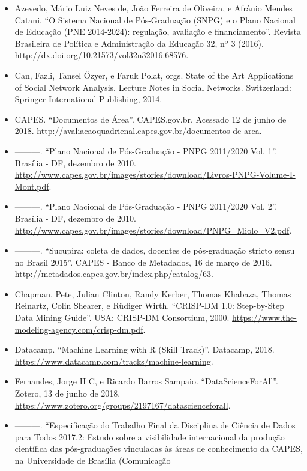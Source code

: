 \documentclass[]{article}
\providecommand{\tightlist}{%
  \setlength{\itemsep}{0pt}\setlength{\parskip}{0pt}}
\begin{document}
\begin{itemize}
\tightlist
\item
  Azevedo, Mário Luiz Neves de, João Ferreira de Oliveira, e Afrânio
  Mendes Catani. ``O Sistema Nacional de Pós-Graduação (SNPG) e o Plano
  Nacional de Educação (PNE 2014-2024): regulação, avaliação e
  financiamento''. Revista Brasileira de Política e Administração da
  Educação 32, nº 3 (2016).
  \url{http://dx.doi.org/10.21573/vol32n32016.68576}.
\item
  Can, Fazli, Tansel Özyer, e Faruk Polat, orgs. State of the Art
  Applications of Social Network Analysis. Lecture Notes in Social
  Networks. Switzerland: Springer International Publishing, 2014.
\item
  CAPES. ``Documentos de Área''. CAPES.gov.br. Acessado 12 de junho de
  2018.
  \url{http://avaliacaoquadrienal.capes.gov.br/documentos-de-area}.
\item
  ---------. ``Plano Nacional de Pós-Graduação - PNPG 2011/2020 Vol.
  1''. Brasília - DF, dezembro de 2010.
  \url{http://www.capes.gov.br/images/stories/download/Livros-PNPG-Volume-I-Mont.pdf}.
\item
  ---------. ``Plano Nacional de Pós-Graduação - PNPG 2011/2020 Vol.
  2''. Brasília - DF, dezembro de 2010.
  \url{http://www.capes.gov.br/images/stories/download/PNPG_Miolo_V2.pdf}.
\item
  ---------. ``Sucupira: coleta de dados, docentes de pós-graduação
  stricto sensu no Brasil 2015''. CAPES - Banco de Metadados, 16 de
  março de 2016.
  \url{http://metadados.capes.gov.br/index.php/catalog/63}.
\item
  Chapman, Pete, Julian Clinton, Randy Kerber, Thomas Khabaza, Thomas
  Reinartz, Colin Shearer, e Rüdiger Wirth. ``CRISP-DM 1.0: Step-by-Step
  Data Mining Guide''. USA: CRISP-DM Consortium, 2000.
  \url{https://www.the-modeling-agency.com/crisp-dm.pdf}.
\item
  Datacamp. ``Machine Learning with R (Skill Track)''. Datacamp, 2018.
  \url{https://www.datacamp.com/tracks/machine-learning}.
\item
  Fernandes, Jorge H C, e Ricardo Barros Sampaio. ``DataScienceForAll''.
  Zotero, 13 de junho de 2018.
  \url{https://www.zotero.org/groups/2197167/datascienceforall}.
\item
  ---------. ``Especificação do Trabalho Final da Disciplina de Ciência
  de Dados para Todos 2017.2: Estudo sobre a visibilidade internacional
  da produção científica das pós-graduações vinculadas às áreas de
  conhecimento da CAPES, na Universidade de Brasília (Comunicação

\end{itemize}
\end{document}
